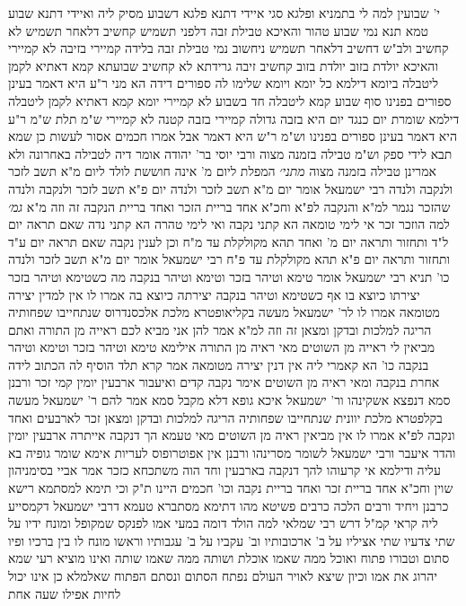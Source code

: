 \documentclass[12pt, openany]{book}
\begin{document}
{י' שבועין למה לי  בתמניא ופלגא סגי 
איידי דתנא פלגא דשבוע מסיק ליה ואיידי דתנא שבוע טמא תנא נמי שבוע טהור 
והאיכא טבילת זבה 
דלפני תשמיש קחשיב דלאחר תשמיש לא קחשיב 
ולב"ש דחשיב דלאחר תשמיש ניחשוב נמי טבילת זבה  בלידה קמיירי בזיבה לא קמיירי 
והאיכא יולדת בזוב  יולדת בזוב קחשיב זיבה גרידתא לא קחשיב 
שבועתא קמא דאתיא לקמן ליטבלה ביומא דילמא כל יומא ויומא שלימו לה ספורים דידה 
הא מני ר"ע היא דאמר  בעינן ספורים בפנינו 
סוף שבוע קמא ליטבלה  חד בשבוע לא קמיירי 
יומא קמא דאתיא לקמן ליטבלה דילמא שומרת יום כנגד יום היא  בזבה גדולה קמיירי בזבה קטנה לא קמיירי 
ש"מ תלת ש"מ  ר"ע היא דאמר  בעינן ספורים בפנינו 
וש"מ ר"ש היא דאמר  אבל אמרו חכמים אסור לעשות כן שמא תבא לידי ספק 
וש"מ  טבילה בזמנה מצוה  ורבי יוסי בר' יהודה אומר  דיה לטבילה באחרונה ולא אמרינן טבילה בזמנה מצוה
{\large\emph{מתני׳}} המפלת ליום מ' אינה חוששת לולד ליום מ"א תשב לזכר ולנקבה ולנדה
רבי ישמעאל אומר  יום מ"א תשב לזכר ולנדה יום פ"א תשב לזכר ולנקבה ולנדה שהזכר נגמר למ"א והנקבה לפ"א  וחכ"א  אחד בריית הזכר ואחד בריית הנקבה זה וזה מ"א
{\large\emph{גמ׳}} למה הוזכר זכר
אי לימי טומאה הא קתני נקבה ואי לימי טהרה
הא קתני נדה 
שאם תראה יום ל"ד ותחזור ותראה יום מ' ואחד תהא מקולקלת עד מ"ח 
וכן לענין נקבה שאם תראה יום ע"ד ותחזור ותראה יום פ"א תהא מקולקלת עד פ"ח
רבי ישמעאל אומר יום מ"א תשב לזכר ולנדה כו' תניא רבי ישמעאל אומר  טימא וטיהר בזכר וטימא וטיהר בנקבה
מה כשטימא וטיהר בזכר יצירתו כיוצא בו אף כשטימא וטיהר בנקבה יצירתה כיוצא בה  אמרו לו  אין למדין יצירה מטומאה 
אמרו לו לר' ישמעאל  מעשה בקליאופטרא מלכת אלכסנדרוס שנתחייבו שפחותיה הריגה למלכות ובדקן ומצאן זה וזה למ"א  אמר להן  אני מביא לכם ראייה מן התורה ואתם מביאין לי ראייה מן השוטים 
מאי ראיה מן התורה  אילימא טימא וטיהר בזכר וטימא וטיהר בנקבה כו' הא קאמרי ליה  אין דנין יצירה מטומאה 
אמר קרא תלד הוסיף לה הכתוב לידה אחרת בנקבה 
ומאי ראיה מן השוטים  אימר  נקבה קדים ואיעבור ארבעין יומין קמי זכר 
ורבנן סמא דנפצא אשקינהו  ור' ישמעאל איכא גופא דלא מקבל סמא
אמר להם ר' ישמעאל  מעשה בקלפטרא מלכת יוונית שנתחייבו שפחותיה הריגה למלכות ובדקן ומצאן זכר לארבעים ואחד ונקבה לפ"א  אמרו לו  אין מביאין ראיה מן השוטים 
מאי טעמא  הך דנקבה אייתרה ארבעין יומין והדר איעבר 
ורבי ישמעאל לשומר מסרינהו ורבנן אין אפוטרופוס לעריות אימא שומר גופיה בא עליה 
ודילמא אי קרעוהו להך דנקבה בארבעין וחד הוה משתכחא כזכר  אמר אביי  בסימניהון שוין
וחכ"א  אחד בריית זכר ואחד בריית נקבה וכו' חכמים היינו ת"ק 
וכי תימא  למסתמא רישא כרבנן ויחיד ורבים הלכה כרבים פשיטא 
מהו דתימא  מסתברא טעמא דרבי ישמעאל דקמסייע ליה קראי קמ"ל
דרש רבי שמלאי  למה הולד דומה במעי אמו לפנקס שמקופל ומונח  ידיו על שתי צדעיו שתי אציליו על ב' ארכובותיו וב' עקביו על ב' עגבותיו וראשו מונח לו בין ברכיו ופיו סתום וטבורו פתוח ואוכל ממה שאמו אוכלת ושותה ממה שאמו שותה ואינו מוציא רעי שמא יהרוג את אמו  וכיון שיצא לאויר העולם נפתח הסתום ונסתם הפתוח שאלמלא כן אינו יכול לחיות אפילו שעה אחת 
}
\end{document}
